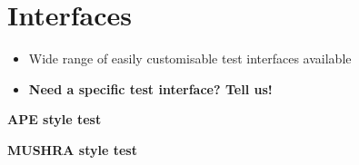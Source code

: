 \vspace{-0.8cm}
\section{Interfaces}

\begin{itemize}
	\item Wide range of easily customisable test interfaces available
	\item 
		{\bf Need a specific test interface? Tell us!}
\end{itemize}




 \centering
 \small
 \textbf{APE style test}

 \vspace{0.6cm}
 
 \centering
 \small
 \textbf{MUSHRA style test}





